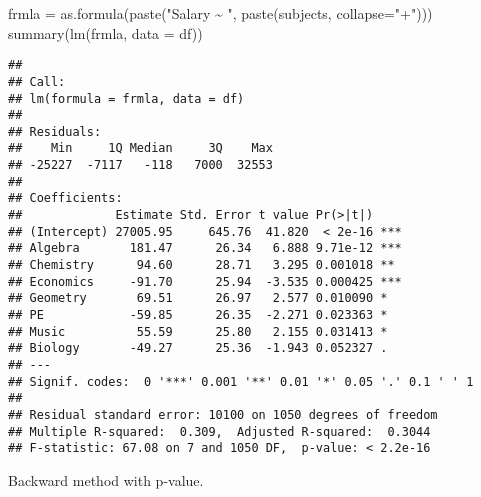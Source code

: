 \documentclass[
]{article}
\newenvironment{Shaded}{\begin{snugshade}}{\end{snugshade}}
\newcommand{\AttributeTok}[1]{\textcolor[rgb]{0.77,0.63,0.00}{#1}}
\newcommand{\FunctionTok}[1]{\textcolor[rgb]{0.00,0.00,0.00}{#1}}
\newcommand{\NormalTok}[1]{#1}
\newcommand{\OtherTok}[1]{\textcolor[rgb]{0.56,0.35,0.01}{#1}}
\newcommand{\StringTok}[1]{\textcolor[rgb]{0.31,0.60,0.02}{#1}}
\begin{document}
\begin{Shaded}
\begin{Highlighting}[]
\NormalTok{frmla }\OtherTok{=} \FunctionTok{as.formula}\NormalTok{(}\FunctionTok{paste}\NormalTok{(}\StringTok{"Salary \textasciitilde{} "}\NormalTok{, }\FunctionTok{paste}\NormalTok{(subjects, }\AttributeTok{collapse=}\StringTok{"+"}\NormalTok{)))}
\FunctionTok{summary}\NormalTok{(}\FunctionTok{lm}\NormalTok{(frmla, }\AttributeTok{data =}\NormalTok{ df))}
\end{Highlighting}
\end{Shaded}

\begin{verbatim}
## 
## Call:
## lm(formula = frmla, data = df)
## 
## Residuals:
##    Min     1Q Median     3Q    Max 
## -25227  -7117   -118   7000  32553 
## 
## Coefficients:
##             Estimate Std. Error t value Pr(>|t|)    
## (Intercept) 27005.95     645.76  41.820  < 2e-16 ***
## Algebra       181.47      26.34   6.888 9.71e-12 ***
## Chemistry      94.60      28.71   3.295 0.001018 ** 
## Economics     -91.70      25.94  -3.535 0.000425 ***
## Geometry       69.51      26.97   2.577 0.010090 *  
## PE            -59.85      26.35  -2.271 0.023363 *  
## Music          55.59      25.80   2.155 0.031413 *  
## Biology       -49.27      25.36  -1.943 0.052327 .  
## ---
## Signif. codes:  0 '***' 0.001 '**' 0.01 '*' 0.05 '.' 0.1 ' ' 1
## 
## Residual standard error: 10100 on 1050 degrees of freedom
## Multiple R-squared:  0.309,  Adjusted R-squared:  0.3044 
## F-statistic: 67.08 on 7 and 1050 DF,  p-value: < 2.2e-16
\end{verbatim}

Backward method with p-value.
\end{document}
